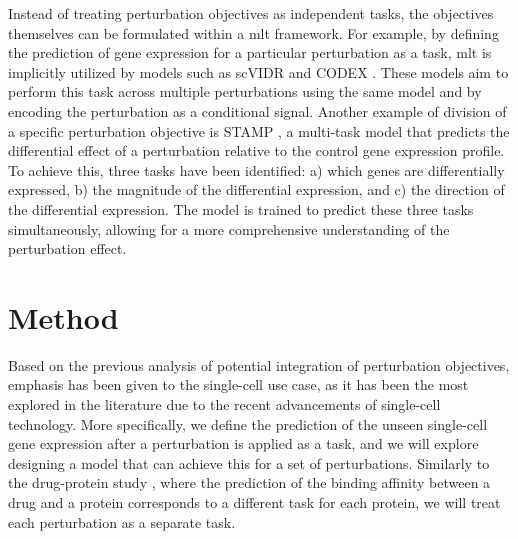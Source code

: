 \documentclass[12pt, a4paper]{article}
\begin{document}
Instead of treating perturbation objectives as independent tasks, the objectives themselves can be formulated within a \gls{mlt} framework. For example, by defining the prediction of gene expression for a particular perturbation as a task, \gls{mlt} is implicitly utilized by models such as scVIDR \cite{kanaGenerativeModelingSinglecell2023} and CODEX \cite{schrod2024codex}. These models aim to perform this task across multiple perturbations using the same model and by encoding the perturbation as a conditional signal. Another example of division of a specific perturbation objective is STAMP \cite{gaoSubtaskDecompositionbasedLearning2024}, a multi-task model that predicts the differential effect of a perturbation relative to the control gene expression profile. To achieve this, three tasks have been identified: a) which genes are differentially expressed, b) the magnitude of the differential expression, and c) the direction of the differential expression. The model is trained to predict these three tasks simultaneously, allowing for a more comprehensive understanding of the perturbation effect.





\section{Method}

Based on the previous analysis of potential integration of perturbation objectives, emphasis has been given to the single-cell 
use case, as it has been the most explored in the literature due to the recent advancements of single-cell technology. More specifically, we define the prediction of the unseen single-cell gene expression after a perturbation is applied as a task, and we will explore designing a model that can achieve this for a set of perturbations. Similarly to the drug-protein study \cite{allenspach2024neural}, where the prediction of the binding affinity between a drug and a protein corresponds to a different task for each protein, we will treat each perturbation as a separate task. 
\end{document}
